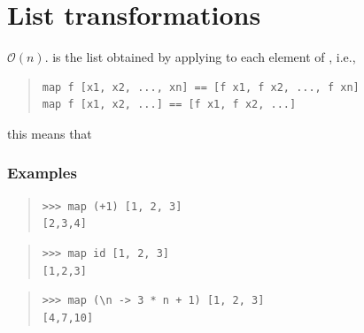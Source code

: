 \section{List transformations}
\begin{haddockdesc}
\item[\begin{tabular}{@{}l}
map :: (a -> b) -> {\char 91}a{\char 93} -> {\char 91}b{\char 93}
\end{tabular}]
{\haddockbegindoc
\(\mathcal{O}(n)\).   is the list obtained by applying  to
 each element of , i.e.,\par
\begin{quote}
{\haddockverb\begin{verbatim}
map f [x1, x2, ..., xn] == [f x1, f x2, ..., f xn]
map f [x1, x2, ...] == [f x1, f x2, ...]\end{verbatim}}
\end{quote}
this means that \par
\subsubsection*{\textbf{Examples}}
\begin{quote}
{\haddockverb\begin{verbatim}
>>> map (+1) [1, 2, 3]
[2,3,4]

\end{verbatim}}
\end{quote}
\begin{quote}
{\haddockverb\begin{verbatim}
>>> map id [1, 2, 3]
[1,2,3]

\end{verbatim}}
\end{quote}
\begin{quote}
{\haddockverb\begin{verbatim}
>>> map (\n -> 3 * n + 1) [1, 2, 3]
[4,7,10]

\end{verbatim}}
\end{quote}}
\end{haddockdesc}

